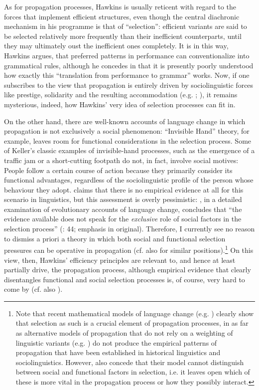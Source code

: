 \documentclass[output=paper]{langsci/langscibook}
\begin{document}
As for propagation processes, Hawkins is usually reticent with regard to the forces that implement efficient structures, even though the central diachronic mechanism in his programme is that of “selection”: efficient variants are said to be selected relatively more frequently than their inefficient counterparts, until they may ultimately oust the inefficient ones completely. It is in this way, Hawkins argues, that preferred patterns in performance can conventionalize into grammatical rules, although he concedes in \citet[10]{Hawkins2014_VarEff} that it is presently poorly understood how exactly this “translation from performance to grammar” works. Now, if one subscribes to the view that propagation is entirely driven by sociolinguistic forces like prestige, solidarity and the resulting accommodation (e.g. \citealt{Croft2000,Cristofaro2017}; ), it remains mysterious, indeed, how Hawkins’ very idea of selection processes can fit in. 

On the other hand, there are well-known accounts of language change in which propagation is not exclusively a social phenomenon:  “Invisible Hand” theory, for example, leaves room for functional considerations in the selection process. Some of Keller’s classic examples of invisible-hand processes, such as the emergence of a traffic jam or a short-cutting footpath do not, in fact, involve social motives: People follow a certain course of action because they primarily consider its functional advantages, regardless of the sociolinguistic profile of the person whose behaviour they adopt. \citet{Cristofaro2017} claims that there is no empirical evidence at all for this scenario in linguistics, but this assessment is overly pessimistic: \citet{Rosenbach2008}, in a detailed examination of evolutionary accounts of language change, concludes that “the evidence available does not speak for the \textit{exclusive} role of social factors in the selection process” (\citealt{Rosenbach2008}: 44; emphasis in original). Therefore, I currently see no reason to dismiss a priori a theory in which both social and functional selection pressures can be operative in propagation (cf. also \citealt{Haspelmath1999_Opt,Nettle1999,Enfield2014} for similar positions).\footnote{Note that recent mathematical models of language change (e.g. \citealt{BlytheCroft2012}) clearly show that selection as such is a crucial element of propagation processes, in as far as alternative models of propagation that do not rely on a weighting of linguistic variants (e.g. \citealt{Trudgill2004}) do not produce the empirical patterns of propagation that have been established in historical linguistics and sociolinguistics. However, \citet{BlytheCroft2012} also concede that their model cannot distinguish between social and functional factors in selection, i.e. it leaves open which of these is more vital in the propagation process or how they possibly interact.} On this view, then, Hawkins’ efficiency principles are relevant to, and hence at least partially drive, the propagation process, although empirical evidence that clearly disentangles functional and social selection processes is, of course, very hard to come by (cf. also \citealt{Seiler2006}). 
\end{document}
